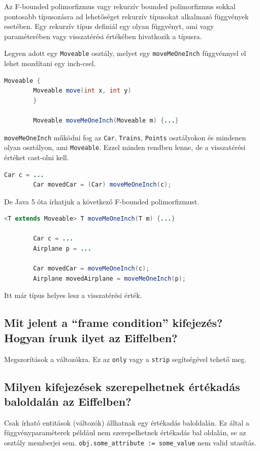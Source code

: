 	Az F-bounded polimorfizmus vagy rekurzív bounded polimorfizmus sokkal pontosabb típusozásra ad lehetőséget rekurzív típusokat alkalmazó függvények esetében. Egy rekurzív típus definiál egy olyan függvényt, ami vagy paraméterében vagy visszatérési értékében hivatkozik a típusra.
	
	Legyen adott egy \lstinline[language=Java]|Moveable| osztály, melyet egy \lstinline[language=Java]|moveMeOneInch| függvénnyel el lehet mozdítani egy inch-csel.
	\begin{lstlisting}[language=Java]
		Moveable {
		Moveable move(int x, int y)
		}
		
		Moveable moveMeOneInch(Moveable m) {...}
	\end{lstlisting}
	
	\lstinline[language=Java]|moveMeOneInch| működni fog az \lstinline[language=Java]|Car|, \lstinline[language=Java]|Trains|, \lstinline[language=Java]|Points| osztályokon és mindenen olyan osztályon, ami \lstinline[language=Java]|Moveable|. Ezzel minden rendben lenne, de a visszatérési értéket cast-olni kell.
	\begin{lstlisting}[language=Java]
		Car c = ...
		Car movedCar = (Car) moveMeOneInch(c);
	\end{lstlisting}
	De Java 5 óta írhatjuk a következő F-bounded polimorfizmust.
	\begin{lstlisting}[language=Java]
		<T extends Moveable> T moveMeOneInch(T m) {...}
		
		Car c = ...
		Airplane p = ...
		
		Car movedCar = moveMeOneInch(c);
		Airplane movedAirplane = moveMeOneInch(p);
	\end{lstlisting}
	Itt már típus helyes lesz a visszatérési érték.
	
\subsection{ Mit jelent a “frame condition” kifejezés? Hogyan írunk ilyet az Eiffelben? }
	Megszorítások a változókra. Ez az \lstinline[language=Eiffel]|only| vagy a \lstinline[language=Eiffel]|strip| segítségével tehető meg.
	
\subsection{ Milyen kifejezések szerepelhetnek értékadás baloldalán az Eiffelben? }
	Csak írható entitások (változók) állhatnak egy értékadás baloldalán. Ez által a függvényparaméterek például nem szerepelhetnek értékadás bal oldalán, se az osztály memberjei sem.
	\lstinline[language=Eiffel]|obj.some_attribute := some_value| nem valid utasítás.
	

